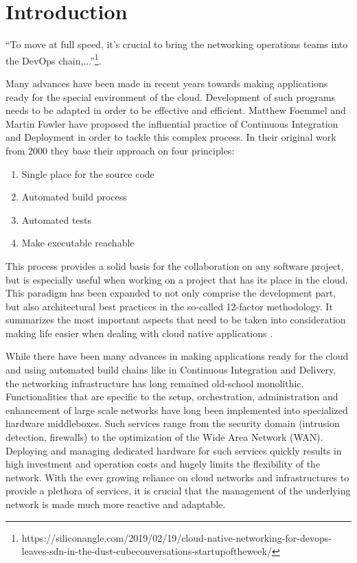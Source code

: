	\section{Introduction}
%

``To move at full speed, it’s crucial to bring the networking operations teams into the DevOps chain,...''\footnote{https://siliconangle.com/2019/02/19/cloud-native-networking-for-devops-leaves-sdn-in-the-dust-cubeconversations-startupoftheweek/}.

Many advances have been made in recent years towards making applications ready for the special environment of the cloud. Development of such programs needs to be adapted in order to be effective and efficient. Matthew Foemmel and Martin Fowler have proposed the influential practice of Continuous Integration and Deployment \cite{fowler_2006} \cite{fowler_foemmel_2000} in order to tackle this complex process. In their original work from 2000 they base their approach  on four principles:
\begin{enumerate}
	\item Single place for the source code
	\item Automated build process
	\item Automated tests
	\item Make executable reachable
\end{enumerate}
This process provides a solid basis for the collaboration on any software project, but is especially useful when working on a project that has its place in the cloud. This paradigm has been expanded to not only comprise the development part, but also architectural best practices in the so-called 12-factor methodology. It summarizes the most important aspects that need to be taken into consideration making life easier when dealing with cloud native applications  \cite{hofmann2017microservices} \cite{12Factor}.  

While there have been many advances in making applications ready for the cloud  and using automated build chains like in Continuous Integration and Delivery,  the networking infrastructure has long remained old-school monolithic. Functionalities that are specific to the setup, orchestration, administration and enhancement of large scale networks have long been implemented into specialized hardware middleboxes. Such services range from the security domain (intrusion detection, firewalls) to the optimization of the Wide Area Network (WAN). Deploying and managing dedicated hardware for such services quickly results in high investment and operation costs and hugely limits the flexibility of the network. With the ever growing reliance on cloud networks and infrastructures to provide a plethora of services, it is crucial that the management of the underlying network is made much more reactive and adaptable. 

